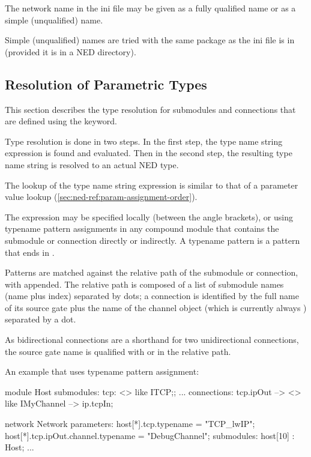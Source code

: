 The network name in the ini file may be given as a fully qualified name
or as a simple (unqualified) name.

Simple (unqualified) names are tried with the same package as the
ini file is in (provided it is in a NED directory).


\subsection{Resolution of Parametric Types}
\label{sec:ned-ref:parameteric-type-resolution}

This section describes the type resolution for submodules and connections
that are defined using the  keyword.

Type resolution is done in two steps. In the first step, the type name
string expression is found and evaluated. Then in the second step, the
resulting type name string is resolved to an actual NED type.

 The lookup of the type name string expression is similar to
that of a parameter value lookup (\ref{sec:ned-ref:param-assignment-order}).

The expression may be specified locally (between the angle brackets), or
using typename pattern assignments in any compound module that
contains the submodule or connection directly or indirectly. A
typename pattern is a pattern that ends in .

Patterns are matched against the relative path of the submodule or
connection, with  appended. The relative path is
composed of a list of submodule names (name plus index) separated
by dots; a connection is identified by the full name of its source
gate plus the name of the channel object (which is currently always
) separated by a dot.

\begin{note}
As bidirectional connections are a shorthand for two unidirectional
connections, the source gate name is qualified with  or
 in the relative path.
\end{note}

An example that uses typename pattern assignment:

\begin{ned}
module Host {
    submodules:
        tcp: <> like ITCP;;
        ...
    connections:
        tcp.ipOut --> <> like IMyChannel --> ip.tcpIn;
}

network Network {
    parameters:
        host[*].tcp.typename = "TCP_lwIP";
        host[*].tcp.ipOut.channel.typename = "DebugChannel";
    submodules:
        host[10] : Host;
        ...
}
\end{ned}

